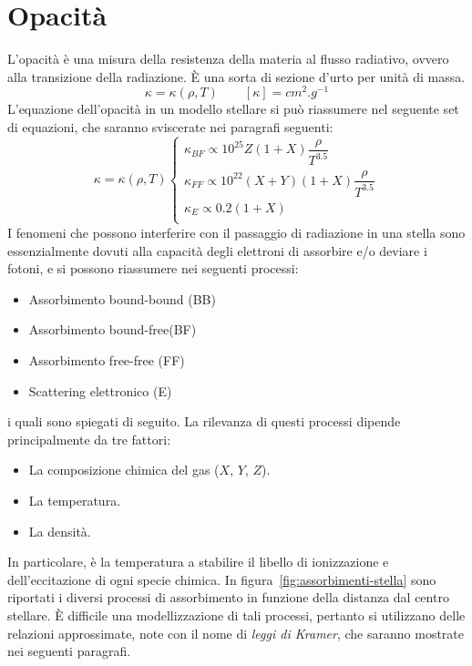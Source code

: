 \section{Opacità}\label{sec:opacità}
L'opacità è una misura della resistenza della materia al flusso radiativo, ovvero alla transizione della radiazione. È una sorta di sezione d'urto per unità di massa.
\[
\kappa = \kappa(\rho, T) \qquad [\kappa] = \si{cm^2.g^{-1}}
\]
L'equazione dell'opacità in un modello stellare si può riassumere nel seguente set di equazioni, che saranno sviscerate nei paragrafi seguenti:
\begin{equation}\label{eq:opacità}
    \kappa = \kappa(\rho, T) 
    \begin{cases} 
    \kappa_{BF} \propto 10^{25} Z(1 + X) \dfrac{\rho}{T^{3.5}} \\ 
    \kappa_{FF} \propto 10^{22} (X+Y)(1+X) \dfrac{\rho}{T^{3.5}} \\ 
    \kappa_{E} \propto 0.2 (1+X) \\ 
    \end{cases}
\end{equation}
I fenomeni che possono interferire con il passaggio di radiazione in una stella sono essenzialmente dovuti alla capacità degli elettroni di assorbire e/o deviare i fotoni, e si possono riassumere nei seguenti processi:
\begin{itemize}
    \item Assorbimento bound-bound (BB)
    \item Assorbimento bound-free(BF)
    \item Assorbimento free-free (FF)
    \item Scattering elettronico (E)
\end{itemize}
i quali sono spiegati di seguito. La rilevanza di questi processi dipende principalmente da tre fattori:
\begin{itemize}
    \item La composizione chimica del gas ($X$, $Y$, $Z$).
    \item La temperatura.
    \item La densità.
\end{itemize}
In particolare, è la temperatura a stabilire il libello di ionizzazione e dell'eccitazione di ogni specie chimica. In figura~\ref{fig:assorbimenti-stella} sono riportati i diversi processi di assorbimento in funzione della distanza dal centro stellare. È difficile una modellizzazione di tali processi, pertanto si utilizzano delle relazioni approssimate, note con il nome di \emph{leggi di Kramer}, che saranno mostrate nei seguenti paragrafi.

